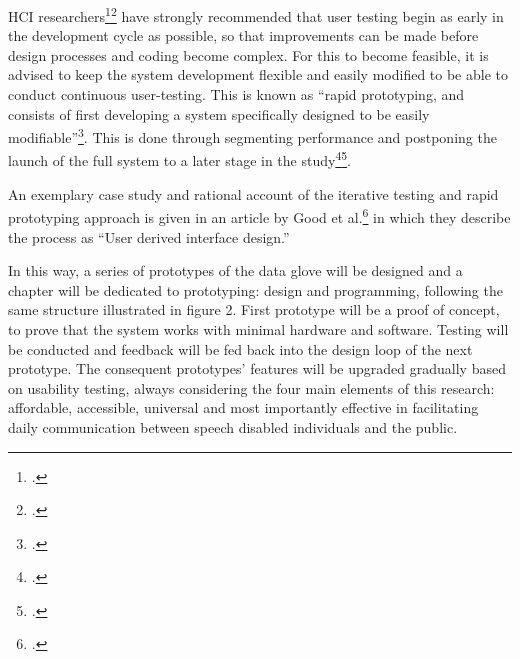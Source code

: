HCI researchers\footcite{Cox2008}\footcite{Lazar2010} have strongly recommended that user testing begin as early in the development cycle as possible, so that improvements can be made before design processes and coding become complex. For this to become feasible, it is advised to keep the system development flexible and easily modified to be able to conduct continuous user-testing. This is known as ``rapid prototyping, and consists of first developing a system specifically designed to be easily modifiable''\footcite{Wania2006}. This is done through segmenting performance and postponing the launch of the full system to a later stage in the study\footcite{Dix2004}\footcite{Georges2004}.

An exemplary case study and rational account of the iterative testing and rapid prototyping approach is given in an article by Good et al.\footcite{Cox2008} in which they describe the process as ``User derived interface design.'' 

In this way, a series of prototypes of the data glove will be designed and a chapter will be dedicated to prototyping: design and programming, following the same structure illustrated in figure 2. First prototype will be a proof of concept, to prove that the system works with minimal hardware and software. Testing will be conducted and feedback will be fed back into the design loop of the next prototype. The consequent prototypes’ features will be upgraded gradually based on usability testing, always considering the four main elements of this research: affordable, accessible, universal and most importantly effective in facilitating daily communication between speech disabled individuals and the public. 

